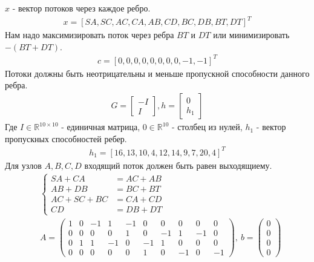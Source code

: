 \documentclass{article}
\newcommand{\R}{\mathbb{R}}
\newcommand{\RM}[2] {\mathbb{R}^{#1 \times #2}}
\begin{document}
    $x$ - вектор потоков через каждое ребро.
    \begin{align*}
        x = [SA, SC, AC, CA, AB, CD, BC, DB, BT, DT]^T
    \end{align*}
    Нам надо максимизировать поток через ребра $BT$ и $DT$ или минимизировать $-(BT + DT)$.
    \begin{align*}
        c = [0, 0, 0, 0, 0, 0, 0, 0, -1, -1]^T
    \end{align*}
    Потоки должны быть неотрицательны и меньше пропускной способности данного ребра.
    \begin{align*}
        G = \left[
            \begin{matrix}
                -I\\
                 I
            \end{matrix}
            \right], 
        h = \left[
            \begin{matrix}
                0\\
                h_1
            \end{matrix}
            \right]
    \end{align*}
    Где $I \in \RM{10}{10}$ - единичная матрица, $0 \in \R^{10}$ - столбец из нулей, $h_1$ - вектор пропускных способностей ребер.
    \begin{align*}
        h_1 = [16, 13, 10, 4, 12, 14, 9, 7, 20, 4]^T   
    \end{align*}
    Для узлов $A, B, C, D$ входящий поток должен быть равен выходящиему.
    \begin{align*}
        &\begin{cases} 
            SA + CA &= AC + AB\\
            AB + DB &= BC + BT\\
            AC + SC + BC &= CA + CD\\
            CD &= DB + DT    
        \end{cases}\\
        &A = \left(
            \begin{matrix}
                1 & 0 & -1 & 1 & -1 & 0 & 0 & 0 & 0 & 0\\
                0 & 0 & 0 & 0 & 1 & 0 & -1 & 1 & -1 & 0\\
                0 & 1 & 1 & -1 & 0 & -1 & 1 & 0 & 0 & 0\\
                0 & 0 & 0 & 0 & 0 & 1 & 0 & -1 & 0 & -1
            \end{matrix}
            \right), \: 
        b = \left(
            \begin{matrix}
                0\\
                0\\
                0\\
                0
            \end{matrix}
            \right)  
    \end{align*}
    
\end{document}
